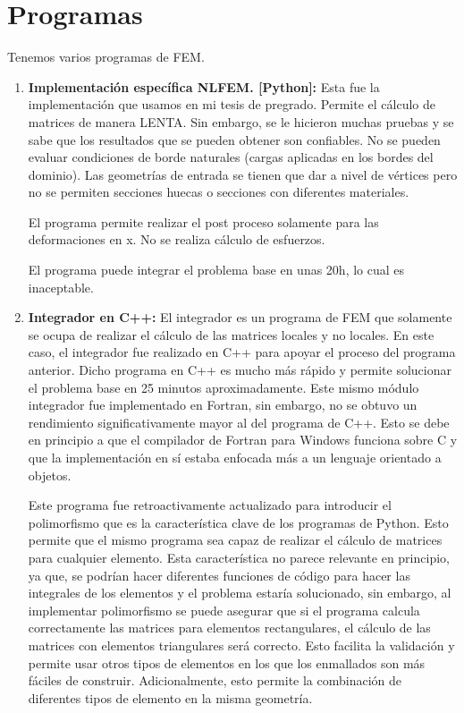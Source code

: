\documentclass{article}
\begin{document}
\sffamily
\pagestyle{fancy}
\hypersetup{pageanchor=false}
{\hypersetup{hidelinks}
}
\newpage
\hypersetup{pageanchor=true}

\section*{Programas}
Tenemos varios programas de FEM.

\begin{enumerate}
  \item \textbf{Implementación específica NLFEM. [Python]:}
        Esta fue la implementación que usamos en mi tesis de pregrado. Permite el cálculo de matrices de manera LENTA. Sin embargo, se le hicieron muchas pruebas y se sabe que los resultados que se pueden obtener son confiables. No se pueden evaluar condiciones de borde naturales (cargas aplicadas en los bordes del dominio). Las geometrías de entrada se tienen que dar a nivel de vértices pero no se permiten secciones huecas o secciones con diferentes materiales.

        El programa permite realizar el post proceso solamente para las deformaciones en x. No se realiza cálculo de esfuerzos.

        El programa puede integrar el problema base en unas 20h, lo cual es inaceptable.

    \item \textbf{Integrador en C++:}
        El integrador es un programa de FEM que solamente se ocupa de realizar el cálculo de las matrices locales y no locales. En este caso, el integrador fue realizado en C++ para apoyar el proceso del programa anterior. Dicho programa en C++ es mucho más rápido y permite solucionar el problema base en 25 minutos aproximadamente. Este mismo módulo integrador fue implementado en Fortran, sin embargo, no se obtuvo un rendimiento significativamente mayor al del programa de C++. Esto se debe en principio a que el compilador de Fortran para Windows funciona sobre C y que la implementación en sí estaba enfocada más a un lenguaje orientado a objetos.

        Este programa fue retroactivamente actualizado para introducir el polimorfismo que es la característica clave de los programas de Python. Esto permite que el mismo programa sea capaz de realizar el cálculo de matrices para cualquier elemento. Esta característica no parece relevante en principio, ya que, se podrían hacer diferentes funciones de código para hacer las integrales de los elementos y el problema estaría solucionado, sin embargo, al implementar polimorfismo se puede asegurar que si el programa calcula correctamente las matrices para elementos rectangulares, el cálculo de las matrices con elementos triangulares será correcto. Esto facilita la validación y permite usar otros tipos de elementos en los que los enmallados son más fáciles de construir. Adicionalmente, esto permite la combinación de diferentes tipos de elemento en la misma geometría.


\end{enumerate}
\end{document}
